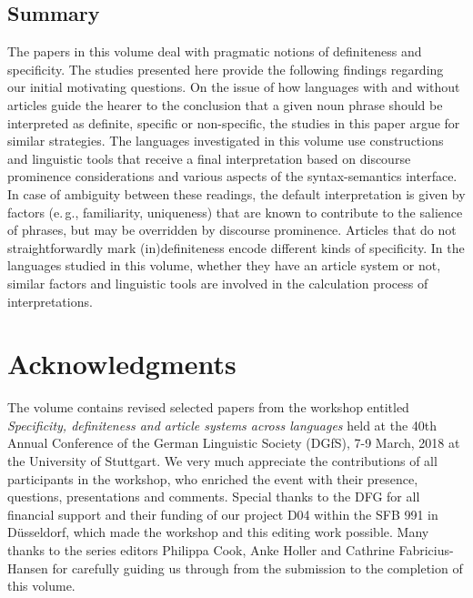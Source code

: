 \documentclass[output=paper]{langsci/langscibook}
\begin{document}
\subsection{Summary}
{
The papers in this volume deal with pragmatic notions of definiteness and specificity. The studies presented here provide the following findings regarding our initial motivating questions. On the issue of how languages with and without articles guide the hearer to the conclusion that a given noun phrase should be interpreted as definite, specific or non-specific, the studies in this paper argue for similar strategies. The languages investigated in this volume use constructions and linguistic tools that receive a final interpretation based on discourse prominence considerations and various aspects of the syntax-semantics interface. In case of ambiguity between these readings, the default interpretation is given by factors (e.\,g., familiarity, uniqueness) that are known to contribute to the salience of phrases, but may be overridden by discourse prominence. Articles that do not straightforwardly mark (in)definiteness encode different kinds of specificity. In the languages studied in this volume, whether they have an article system or not, similar factors and linguistic tools are involved in the calculation process of interpretations.
}

\section*{Acknowledgments}
The volume contains revised selected papers from the workshop entitled {\emph{Specificity, definiteness and article systems across languages}} held at the 40th Annual Conference of the German Linguistic Society (DGfS), 7-9 March, 2018 at the University of Stuttgart. We very much appreciate the contributions of all participants in the workshop, who enriched the event with their presence, questions, presentations and comments. Special thanks to the DFG for all financial support and their funding of our project D04 within the SFB 991 in D\"usseldorf, which made the workshop and this editing work possible.
Many thanks to the series editors Philippa Cook, Anke Holler and Cathrine Fabricius-Hansen for carefully guiding us through from the submission to the completion of this volume.


{\sloppy\printbibliography[heading=subbibliography,notkeyword=this]}
\end{document}
